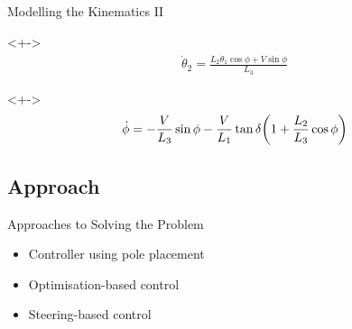 \begin{frame}{Modelling the Kinematics II}
\begin{minipage}{0.55\textwidth}
    \begin{onlyenv}<+->
    \begin{align*}
        \dot{\theta}_{2} =  \frac{L_{2} \dot{\theta}_{1} \cos \phi + V \sin \phi }{L_{3}}
    \end{align*}
    \end{onlyenv}
\end{minipage}
\begin{onlyenv}<+->
\begin{align}\label{eq:dotphi-final}
    \dot{\phi} = - \frac{V}{L_{3}} \sin \phi - \frac{V}{L_{1}} \tan \delta \qty( 1 + \frac{L_{2}}{L_{3}} \cos \phi )
\end{align}
\end{onlyenv}
    
\end{frame}

\subsection{Approach}
\begin{frame}{Approaches to Solving the Problem}
\begin{itemize}
    \item Controller using pole placement
    \item Optimisation-based control
    \item Steering-based control
\end{itemize}

\end{frame}